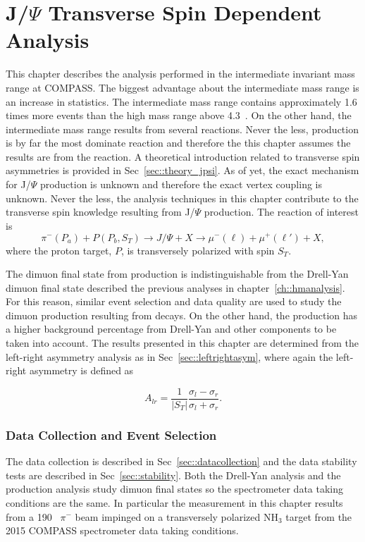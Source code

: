 \chapter{J/$\Psi$ Transverse Spin Dependent Analysis}
\label{ch::jpsi}
\ifpdf
\graphicspath{{Chapters/JPsi/Figs/}}
\fi

This chapter describes the analysis performed in the intermediate invariant mass
range at COMPASS.  The biggest advantage about the intermediate mass range is an
increase in statistics.  The intermediate mass range contains approximately 1.6
times more events than the high mass range above 4.3~{\gvcw}.  On the other
hand, the intermediate mass range results from several reactions.  Never the
less, {\jp} production is by far the most dominate reaction and therefore the
this chapter assumes the results are from the {\jp} reaction.  A theoretical
introduction related to transverse {\jp} spin asymmetries is provided in
Sec~\ref{sec::theory_jpsi}.  As of yet, the exact mechanism for J/$\Psi$
production is unknown and therefore the exact {\jp} vertex coupling is unknown.
Never the less, the analysis techniques in this chapter contribute to the
transverse spin knowledge resulting from J/$\Psi$ production.  The reaction of
interest is
\begin{equation}
  \pi^-(P_a) + P(P_b, S_T) \rightarrow J/\Psi + X \rightarrow \mu^-(\ell) +
  \mu^+(\ell') + X,
\end{equation}
\noindent
where the proton target, $P$, is transversely polarized with spin $S_T$.

The dimuon final state from {\jp} production is indistinguishable from the
Drell-Yan dimuon final state described the previous analyses in
chapter~\ref{ch::hmanalysis}.  For this reason, similar event selection and data
quality are used to study the dimuon production resulting from {\jp} decays.  On
the other hand, the {\jp} production has a higher background percentage from
Drell-Yan and other components to be taken into account.  The results presented
in this chapter are determined from the left-right asymmetry analysis as in
Sec~\ref{sec::leftrightasym}, where again the left-right asymmetry is defined as

\begin{equation}
  A_{lr} = \frac{1}{|S_T|}
  \frac{\sigma_l - \sigma_r}{\sigma_l +
    \sigma_r}.
\end{equation}

\subsection{Data Collection and Event Selection}
The data collection is described in Sec~\ref{sec::datacollection} and the data
stability tests are described in Sec~\ref{sec::stability}.  Both the Drell-Yan
analysis and the {\jp} production analysis study dimuon final states so the
spectrometer data taking conditions are the same.  In particular the measurement
in this chapter results from a 190~{\gvc} $\pi^-$ beam impinged on a
transversely polarized NH$_3$ target from the 2015 COMPASS spectrometer data
taking conditions.

